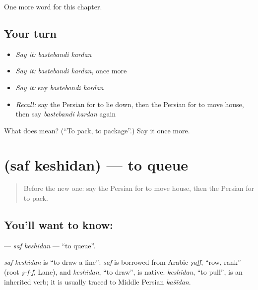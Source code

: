 \begin{grammarlens}[title={What you've built}]
One more word for this chapter.
\end{grammarlens}

\subsection*{Your turn}
\begin{itemize}
\raggedright
  \item \emph{Say it:} \emph{bastebandi kardan}
  \item \emph{Say it:} \emph{bastebandi kardan}, once more
  \item \emph{Say it:} say \emph{bastebandi kardan}
  \item \emph{Recall:} say the Persian for to lie down, then the Persian for to move house, then say \emph{bastebandi kardan} again
\end{itemize}

\begin{tcolorbox}[breakable,colback=teal!4,colframe=teal!35!black,title={Before you move on}]
What does    mean? (\textquotedblleft{}To pack, to package\textquotedblright{}.) Say it once more.
\end{tcolorbox}
\section[\texorpdfstring{\fa{صف} \fa{کشیدن} (saf keshidan)}{صف کشیدن (saf keshidan)}]{  (saf keshidan) — to queue}

\label{lesson:FA-C262-saf-keshidan}



\begin{quote}
Before the new one: say the Persian for to move house, then the Persian for to pack.
\end{quote}

\subsection*{You'll want to know:  }
\textbf{ } — \emph{saf keshidan} — \textquotedblleft{}to queue\textquotedblright{}.

\begin{cousinweb}
\emph{saf keshidan} is \textquotedblleft{}to draw a line\textquotedblright{}: \emph{saf} is borrowed from Arabic \emph{ṣaff}, \textquotedblleft{}row, rank\textquotedblright{} (root \emph{ṣ-f-f}, Lane), and \emph{keshidan}, \textquotedblleft{}to draw\textquotedblright{}, is native. \emph{keshidan}, \textquotedblleft{}to pull\textquotedblright{}, is an inherited verb; it is usually traced to Middle Persian \emph{kašīdan}.
\end{cousinweb}


